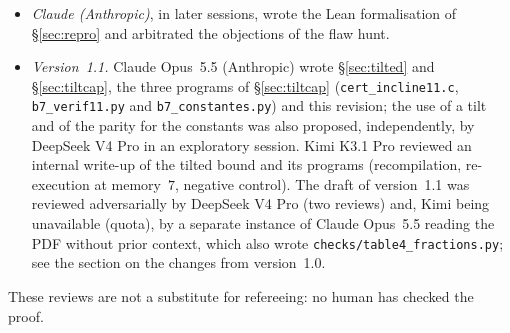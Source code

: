 \documentclass[11pt,a4paper]{article}
\theoremstyle{plain}
\theoremstyle{remark}
\numberwithin{equation}{section}
\begin{document}
\begin{itemize}
(Corollary~\ref{cor:tension}) and the remark on the range of $R$ (Remark~\ref{rem:table}).
\item \emph{Claude (Anthropic)}, in later sessions, wrote the Lean formalisation of \S\ref{sec:repro} and arbitrated the objections of
the flaw hunt.
\item \emph{Version~1.1.} Claude Opus~5.5 (Anthropic) wrote \S\ref{sec:tilted} and \S\ref{sec:tiltcap}, the three programs of
\S\ref{sec:tiltcap} (\texttt{cert\_incline11.c}, \texttt{b7\_verif11.py} and \texttt{b7\_constantes.py}) and this revision; the use of a tilt and of the
parity for the constants was also proposed, independently, by DeepSeek V4 Pro in an exploratory session. Kimi K3.1 Pro reviewed an
internal write-up of the tilted bound and its programs (recompilation, re-execution at memory~$7$, negative control). The draft of
version~1.1 was reviewed adversarially by DeepSeek V4 Pro (two reviews) and, Kimi being unavailable (quota), by a separate instance
of Claude Opus~5.5 reading the PDF without prior context, which also wrote \texttt{checks/table4\_fractions.py}; see the section on
the changes from version~1.0.
\end{itemize}
These reviews are not a substitute for refereeing: no human has checked the proof.
\end{document}
